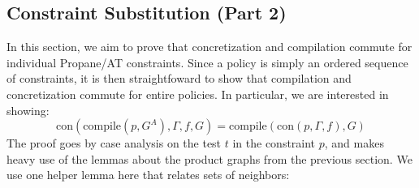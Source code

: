 \documentclass[twocolumn, openany]{sig-alternate-10pt}
\newcommand{\sysname}{{\small \sf Propane/AT}\xspace}
\newcommand{\Con}{\mathrm{con}}
\newcommand{\Compile}{\ensuremath{\mathrm{compile}}}
\begin{document}
\vspace{3em}
\subsection{Constraint Substitution (Part 2)}

In this section, we aim to prove that concretization and compilation commute for individual \sysname constraints. Since a policy is simply an ordered sequence of constraints, it is then straightfoward to show that compilation and concretization commute for entire policies. In particular, we are interested in showing:
%
$$\Con(\Compile(p, G^A), \Gamma, f, G) = \Compile(\Con(p,\Gamma,f), G)$$
%
The proof goes by case analysis on the test $t$ in the constraint $p$, and makes heavy use of the lemmas about the product graphs from the previous section. We use one helper lemma here that relates sets of neighbors:
\end{document}
